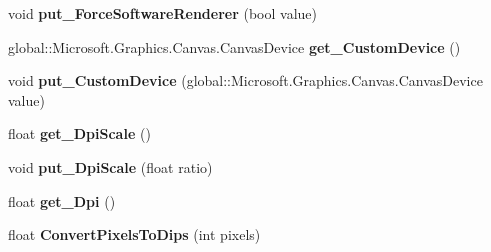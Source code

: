 \begin{DoxyCompactItemize}
void {\bfseries put\+\_\+\+Force\+Software\+Renderer} (bool value)
\item 
\mbox{\label{class_microsoft_1_1_graphics_1_1_canvas_1_1_u_i_1_1_xaml_1_1_canvas_animated_control_a17fb6529b7f97cb7eec28db12e4e438b}} 
global\+::\+Microsoft.\+Graphics.\+Canvas.\+Canvas\+Device {\bfseries get\+\_\+\+Custom\+Device} ()
\item 
\mbox{\label{class_microsoft_1_1_graphics_1_1_canvas_1_1_u_i_1_1_xaml_1_1_canvas_animated_control_a78fcff8bd800e4cefb4b1a3e7fdf0bbb}} 
void {\bfseries put\+\_\+\+Custom\+Device} (global\+::\+Microsoft.\+Graphics.\+Canvas.\+Canvas\+Device value)
\item 
\mbox{\label{class_microsoft_1_1_graphics_1_1_canvas_1_1_u_i_1_1_xaml_1_1_canvas_animated_control_a0f7a2890504c7e9d2ed733f76f001880}} 
float {\bfseries get\+\_\+\+Dpi\+Scale} ()
\item 
\mbox{\label{class_microsoft_1_1_graphics_1_1_canvas_1_1_u_i_1_1_xaml_1_1_canvas_animated_control_a2d14da04c7f91c1074f1acd0e450c4b4}} 
void {\bfseries put\+\_\+\+Dpi\+Scale} (float ratio)
\item 
\mbox{\label{class_microsoft_1_1_graphics_1_1_canvas_1_1_u_i_1_1_xaml_1_1_canvas_animated_control_a21b8d49117017e05ba0ae216f1361829}} 
float {\bfseries get\+\_\+\+Dpi} ()
\item 
\mbox{\label{class_microsoft_1_1_graphics_1_1_canvas_1_1_u_i_1_1_xaml_1_1_canvas_animated_control_ab0b1da0cf267c685934b92f346cce7cf}} 
float {\bfseries Convert\+Pixels\+To\+Dips} (int pixels)
\item 
\mbox{\label{class_microsoft_1_1_graphics_1_1_canvas_1_1_u_i_1_1_xaml_1_1_canvas_animated_control_aa34dd27c9c4151d704bfb1983c806c32}} 

\end{DoxyCompactItemize}
